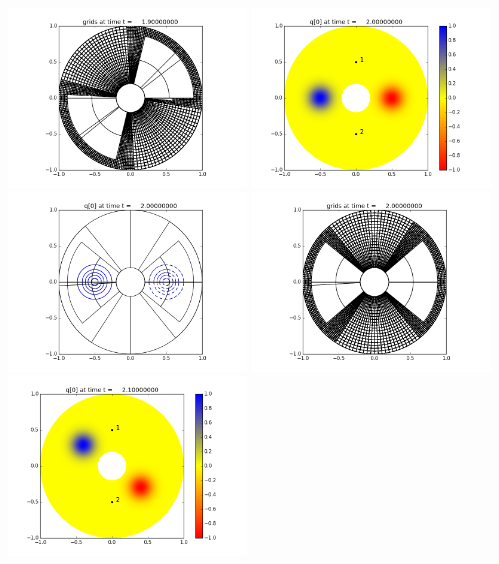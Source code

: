 \documentclass[11pt]{article}
\begin{document}
\vskip 10pt 
\includegraphics[width=0.475\textwidth]{frame0019fig2.png}
\vskip 10pt 
\includegraphics[width=0.475\textwidth]{frame0020fig0.png}
\includegraphics[width=0.475\textwidth]{frame0020fig1.png}
\vskip 10pt 
\includegraphics[width=0.475\textwidth]{frame0020fig2.png}
\vskip 10pt 
\includegraphics[width=0.475\textwidth]{frame0021fig0.png}
\end{document}
